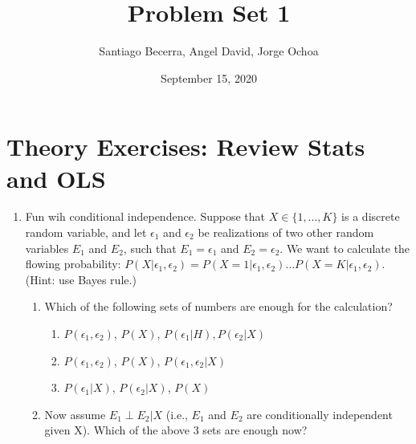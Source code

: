\documentclass[12pt,onecolumn]{article}
\begin{document}
\title{Problem Set 1}
\author{Santiago Becerra, Angel David, Jorge Ochoa}
\date{September 15, 2020}

\maketitle
\vspace{-7mm}

\section{Theory Exercises: Review Stats and OLS}

\begin{enumerate}

  \item Fun wih conditional independence.  Suppose that $X\in \{1,...,K\} $ is a discrete random variable, and let $\epsilon_1$ and $\epsilon_2$ be realizations of two other random variables $E_1$ and $E_2$, such that $E_1=\epsilon_1$ and $E_2=\epsilon_2$. We want to calculate the flowing probability: $P(X|\epsilon_1,\epsilon_2)= P(X=1|\epsilon_1,\epsilon_2)\dots  P(X=K|\epsilon_1,\epsilon_2)$. (Hint: use Bayes rule.)
  \begin{enumerate}
  \item Which of the following sets of numbers are enough for the calculation?
  \begin{enumerate}
    \item $P(\epsilon_1,\epsilon_2)$, $P(X)$, $P(\epsilon_1|H), P(\epsilon_2|X)$
    \item $P(\epsilon_1,\epsilon_2)$, $P(X)$, $P(\epsilon_1,\epsilon_2|X)$ 
    \item $P(\epsilon_1|X)$, $P(\epsilon_2|X)$, $P(X)$
    \end{enumerate}
    \item Now  assume $E_1 \perp E_2|X$ (i.e., $E_1$ and $E_2$ are conditionally independent given X). Which of the above 3 sets are enough now?
  \end{enumerate}

 


\end{enumerate}
\end{document}
